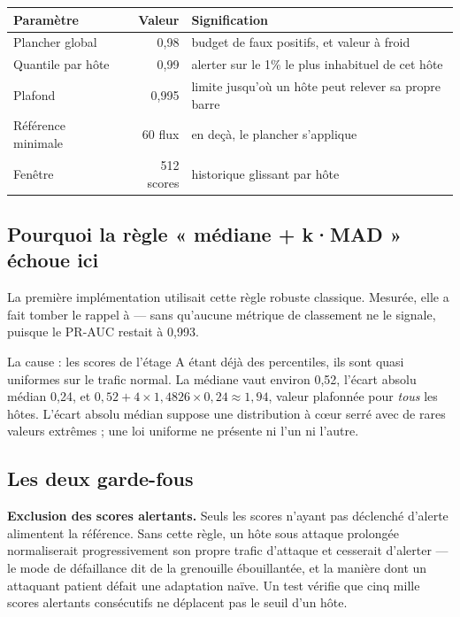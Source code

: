 \documentclass[11pt,a4paper]{article}
\begin{document}
\begin{table}[h]\centering\small
\begin{tabularx}{\linewidth}{@{}l r X@{}}
\toprule
\textbf{Paramètre} & \textbf{Valeur} & \textbf{Signification} \\
\midrule
Plancher global & 0,98 & budget de faux positifs, et valeur à froid \\
Quantile par hôte & 0,99 & alerter sur le 1\% le plus inhabituel de cet hôte \\
Plafond & 0,995 & limite jusqu'où un hôte peut relever sa propre barre \\
Référence minimale & 60 flux & en deçà, le plancher s'applique \\
Fenêtre & 512 scores & historique glissant par hôte \\
\bottomrule
\end{tabularx}
\end{table}

\subsection{Pourquoi la règle « médiane + k·MAD » échoue ici}

La première implémentation utilisait cette règle robuste classique. Mesurée, elle a fait tomber le
rappel à  --- sans qu'aucune métrique de classement ne le signale, puisque le PR-AUC
restait à 0,993.

La cause : les scores de l'étage A étant déjà des percentiles, ils sont quasi uniformes sur le
trafic normal. La médiane vaut environ 0,52, l'écart absolu médian 0,24, et
$0{,}52 + 4 \times 1{,}4826 \times 0{,}24 \approx 1{,}94$, valeur plafonnée pour \emph{tous} les
hôtes. L'écart absolu médian suppose une distribution à c\oe{}ur serré avec de rares valeurs
extrêmes ; une loi uniforme ne présente ni l'un ni l'autre.

\subsection{Les deux garde-fous}

\textbf{Exclusion des scores alertants.} Seuls les scores n'ayant pas déclenché d'alerte alimentent
la référence. Sans cette règle, un hôte sous attaque prolongée normaliserait progressivement son
propre trafic d'attaque et cesserait d'alerter --- le mode de défaillance dit \og{}de la grenouille
ébouillantée\fg{}, et la manière dont un attaquant patient défait une adaptation naïve. Un test
vérifie que cinq mille scores alertants consécutifs ne déplacent pas le seuil d'un hôte.
\end{document}
